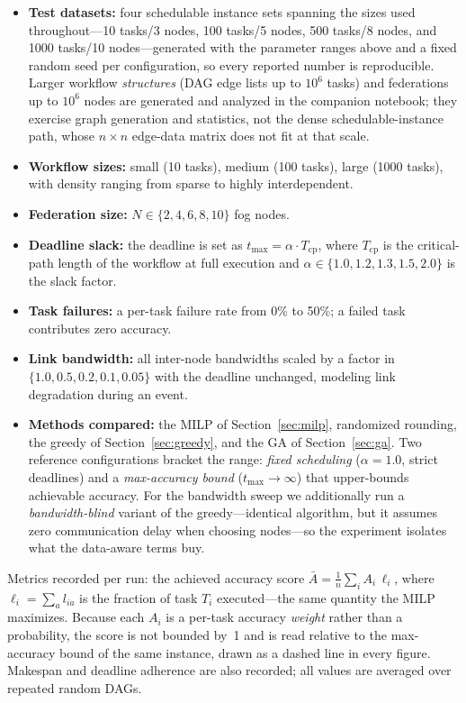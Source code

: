 \documentclass[conference]{IEEEtran}
\begin{document}
\begin{itemize}
    \item \textbf{Test datasets:} four schedulable instance sets spanning the sizes used throughout---10 tasks/3 nodes, 100 tasks/5 nodes, 500 tasks/8 nodes, and 1000 tasks/10 nodes---generated with the parameter ranges above and a fixed random seed per configuration, so every reported number is reproducible. Larger workflow \emph{structures} (DAG edge lists up to $10^6$ tasks) and federations up to $10^6$ nodes are generated and analyzed in the companion notebook; they exercise graph generation and statistics, not the dense schedulable-instance path, whose $n\times n$ edge-data matrix does not fit at that scale.
    \item \textbf{Workflow sizes:} small (10 tasks), medium (100 tasks), large (1000 tasks), with density ranging from sparse to highly interdependent.
    \item \textbf{Federation size:} $N\in\{2,4,6,8,10\}$ fog nodes.
    \item \textbf{Deadline slack:} the deadline is set as $t_{\max}=\alpha\cdot T_{\mathrm{cp}}$, where $T_{\mathrm{cp}}$ is the critical-path length of the workflow at full execution and $\alpha\in\{1.0,1.2,1.3,1.5,2.0\}$ is the slack factor.
    \item \textbf{Task failures:} a per-task failure rate from 0\% to 50\%; a failed task contributes zero accuracy.
    \item \textbf{Link bandwidth:} all inter-node bandwidths scaled by a factor in $\{1.0, 0.5, 0.2, 0.1, 0.05\}$ with the deadline unchanged, modeling link degradation during an event.
    \item \textbf{Methods compared:} the MILP of Section~\ref{sec:milp}, randomized rounding, the greedy of Section~\ref{sec:greedy}, and the GA of Section~\ref{sec:ga}. Two reference configurations bracket the range: \emph{fixed scheduling} ($\alpha=1.0$, strict deadlines) and a \emph{max-accuracy bound} ($t_{\max}\!\to\!\infty$) that upper-bounds achievable accuracy. For the bandwidth sweep we additionally run a \emph{bandwidth-blind} variant of the greedy---identical algorithm, but it assumes zero communication delay when choosing nodes---so the experiment isolates what the data-aware terms buy.
\end{itemize}

Metrics recorded per run: the achieved accuracy score $\bar{A}=\frac{1}{n}\sum_i A_i\,\ell_i$, where $\ell_i=\sum_a l_{ia}$ is the fraction of task $T_i$ executed---the same quantity the MILP maximizes. Because each $A_i$ is a per-task accuracy \emph{weight} rather than a probability, the score is not bounded by~1 and is read relative to the max-accuracy bound of the same instance, drawn as a dashed line in every figure. Makespan and deadline adherence are also recorded; all values are averaged over repeated random DAGs.
\end{document}
